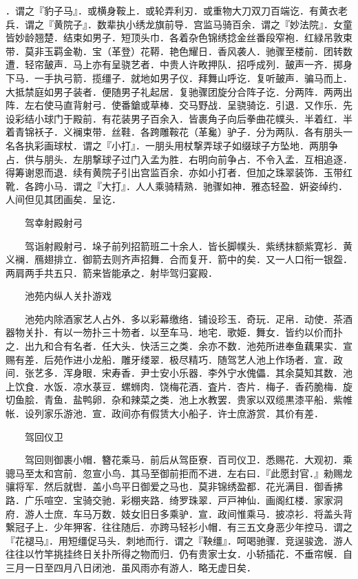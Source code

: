 ．谓之『豹子马』．或横身鞍上．或轮弄利刃．或重物大刀双刀百端讫．有黄衣老兵．谓之『黄院子』．数辈执小绣龙旗前导．宫监马骑百余．谓之『妙法院』．女童皆妙龄翘楚．结束如男子．短顶头巾．各着杂色锦绣捻金丝番段窄袍．红緑吊敦束带．莫非玉羁金勒．宝（革登）花鞯．艳色耀日．香风袭人．驰骤至楼前．团转数遭．轻帘皷声．马上亦有呈骁艺者．中贵人许畋押队．招呼成列．皷声一齐．掷身下马．一手执弓箭．揽缰子．就地如男子仪．拜舞山呼讫．复听皷声．骗马而上．大抵禁庭如男子装者．便随男子礼起居．复驰骤团旋分合阵子讫．分两阵．两两出阵．左右使马直背射弓．使番鎗或草棒．交马野战．呈骁骑讫．引退．又作乐．先设彩结小球门于殿前．有花装男子百余入．皆裹角子向后拳曲花幞头．半着红．半着青锦袄子．义襕束带．丝鞋．各跨雕鞍花（革毚）驴子．分为两队．各有朋头一名各执彩画球杖．谓之『小打』．一朋头用杖撃弄球子如缀球子方坠地．两朋争占．供与朋头．左朋撃球子过门入孟为胜．右明向前争占．不令入孟．互相追逐．得筹谢恩而退．续有黄院子引出宫监百余．亦如小打者．但加之珠翠装饰．玉带红靴．各跨小马．谓之『大打』．人人乘骑精熟．驰骤如神．雅态轻盈．姸姿绰约．人间但见其团画矣．呈讫．

　　驾幸射殿射弓

　　驾诣射殿射弓．垛子前列招箭班二十余人．皆长脚幞头．紫绣抹额紫寛衫．黄义襕．鴈翅排立．御箭去则齐声招舞．合而复开．箭中的矣．又一人口衔一银盌．两肩两手共五只．箭来皆能承之．射毕驾归宴殿．

　　池苑内纵人关扑游戏

　　池苑内除酒家艺人占外．多以彩幕缴络．铺设珍玉．奇玩．疋帛．动使．茶酒器物关扑．有以一笏扑三十笏者．以至车马．地宅．歌姫．舞女．皆约以价而扑之．出九和合有名者．任大头．快活三之类．余亦不数．池苑所进奉鱼藕果实．宣赐有差．后苑作进小龙船．雕牙缕翠．极尽精巧．随驾艺人池上作场者．宣．政间．张艺多．浑身眼．宋寿香．尹士安小乐器．李外宁水傀儡．其余莫知其数．池上饮食．水饭．凉水菉豆．螺蛳肉．饶梅花酒．査片．杏片．梅子．香药脆梅．旋切鱼脍．青鱼．盐鸭卵．杂和辣菜之类．池上水教罢．贵家以双缆黒漆平船．紫帷帐．设列家乐游池．宣．政间亦有假赁大小船子．许士庶游赏．其价有差．

　　驾回仪卫

　　驾回则御裹小帽．簪花乘马．前后从驾臣寮．百司仪卫．悉赐花．大观初．乘骢马至太和宫前．忽宣小鸟．其马至御前拒而不进．左右曰．『此愿封官．』勑赐龙骧将军．然后就辔．盖小鸟平日御爱之马也．莫非锦绣盈都．花光满目．御香拂路．广乐喧空．宝骑交驰．彩棚夹路．绮罗珠翠．戸戸神仙．画阁红楼．家家洞府．游人士庶．车马万数．妓女旧日多乘驴．宣．政间惟乘马．披凉衫．将盖头背繋冠子上．少年狎客．往往随后．亦跨马轻衫小帽．有三五文身恶少年控马．谓之『花褪马』．用短缰促马头．刺地而行．谓之『鞅缰』．呵喝驰骤．竞逞骏逸．游人往往以竹竿挑挂终日关扑所得之物而归．仍有贵家士女．小轿插花．不垂帘幙．自三月一日至四月八日闭池．虽风雨亦有游人．略无虚日矣．


